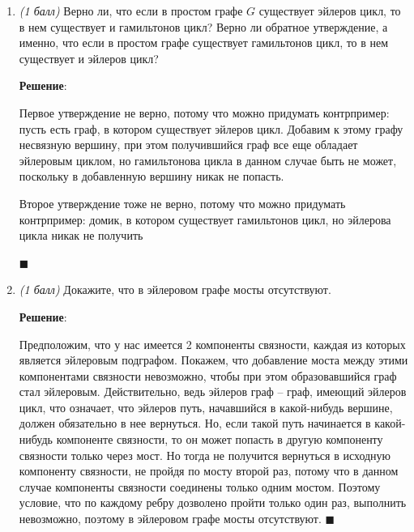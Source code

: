 \documentclass{article}
\begin{document}
\begin{enumerate}

    \item \textit{(1 балл)} Верно ли, что если в простом графе $G$ существует эйлеров цикл, то в нем существует и гамильтонов цикл? Верно ли обратное утверждение, а именно, что если в простом графе существует гамильтонов цикл, то в нем существует и эйлеров цикл?
    
    \textbf{Решение}:

    Первое утверждение не верно, потому что можно придумать контрпример: пусть есть граф, в котором существует эйлеров цикл. Добавим к этому графу несвязную вершину, при этом получившийся граф все еще обладает эйлеровым циклом, но гамильтонова цикла в данном случае быть не может, поскольку в добавленную вершину никак не попасть.

    Второе утверждение тоже не верно, потому что можно придумать контрпример: домик, в котором существует гамильтонов цикл, но эйлерова цикла никак не получить
    \begin{figure}[h!]
        \centering
    \end{figure}
    \begin{flushright}
        $\blacksquare$
    \end{flushright}
    
    \item \textit{(1 балл)} Докажите, что в эйлеровом графе мосты отсутствуют.
    
    \textbf{Решение}:

    Предположим, что у нас имеется 2 компоненты связности, каждая из которых является эйлеровым подграфом. Покажем, что добавление моста между этими компонентами связности невозможно, чтобы при этом образовавшийся граф стал эйлеровым. Действительно, ведь эйлеров граф -- граф, имеющий эйлеров цикл, что означает, что эйлеров путь, начавшийся в какой-нибудь вершине, должен обязательно в нее вернуться. Но, если такой путь начинается в какой-нибудь компоненте связности, то он может попасть в другую компоненту связности только через мост. Но тогда не получится вернуться в исходную компоненту связности, не пройдя по мосту второй раз, потому что в данном случае компоненты связности соединены только одним мостом. Поэтому условие, что по каждому ребру дозволено пройти только один раз, выполнить невозможно, поэтому в эйлеровом графе мосты отсутствуют. $\blacksquare$
    

\end{enumerate}
\end{document}
